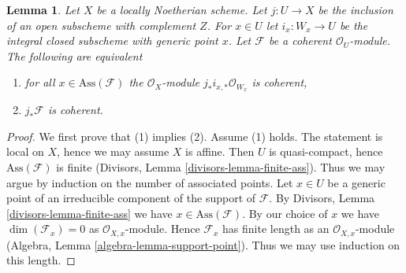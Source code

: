 \documentclass[10pt,a4paper]{amsart}
\theoremstyle{plain}
\newtheorem{lemma}[subsection]{Lemma}
\theoremstyle{definition}
\theoremstyle{remark}
\numberwithin{equation}{subsection}
\begin{document}
\begin{lemma}
\label{lemma-check-finiteness-pushforward-on-associated-points}
Let $X$ be a locally Noetherian scheme. Let $j : U \to X$ be the inclusion
of an open subscheme with complement $Z$. For $x \in U$ let
$i_x : W_x \to U$ be the integral closed subscheme with generic point $x$.
Let $\mathcal{F}$ be a coherent $\mathcal{O}_U$-module.
The following are equivalent
\begin{enumerate}
\item for all $x \in \text{Ass}(\mathcal{F})$ the
$\mathcal{O}_X$-module $j_*i_{x, *}\mathcal{O}_{W_x}$ is coherent,
\item $j_*\mathcal{F}$ is coherent.
\end{enumerate}
\end{lemma}

\begin{proof}
We first prove that (1) implies (2). Assume (1) holds.
The statement is local on $X$, hence we may assume $X$ is affine.
Then $U$ is quasi-compact, hence $\text{Ass}(\mathcal{F})$ is finite
(Divisors, Lemma \ref{divisors-lemma-finite-ass}). Thus we may argue by
induction on the number of associated points. Let $x \in U$ be a generic
point of an irreducible component of the support of $\mathcal{F}$.
By Divisors, Lemma \ref{divisors-lemma-finite-ass} we have
$x \in \text{Ass}(\mathcal{F})$. By our choice of $x$ we have
$\dim(\mathcal{F}_x) = 0$ as $\mathcal{O}_{X, x}$-module.
Hence $\mathcal{F}_x$ has finite length as an $\mathcal{O}_{X, x}$-module
(Algebra, Lemma \ref{algebra-lemma-support-point}).
Thus we may use induction on this length.


\end{proof}
\end{document}
